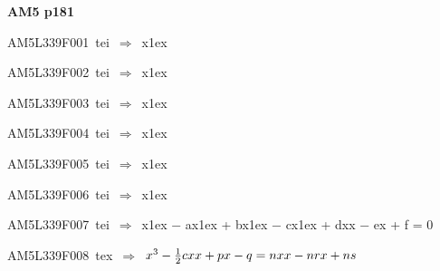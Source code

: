\par\vfill\eject
{\bf\hfill AM5 p181\hfill\hbox{}}\par\bigskip
{\sixrm AM5L339F001\ {\sixit tei}\ }$\Rightarrow$\ {\tenit x}\raise1ex\hbox{}\par\smallskip
{\sixrm AM5L339F002\ {\sixit tei}\ }$\Rightarrow$\ {\tenit x}\raise1ex\hbox{}\par\smallskip
{\sixrm AM5L339F003\ {\sixit tei}\ }$\Rightarrow$\ {\tenit x}\raise1ex\hbox{}\par\smallskip
{\sixrm AM5L339F004\ {\sixit tei}\ }$\Rightarrow$\ {\tenit x}\raise1ex\hbox{}\par\smallskip
{\sixrm AM5L339F005\ {\sixit tei}\ }$\Rightarrow$\ {\tenit x}\raise1ex\hbox{}\par\smallskip
{\sixrm AM5L339F006\ {\sixit tei}\ }$\Rightarrow$\ {\tenit x}\raise1ex\hbox{}\par\smallskip
{\sixrm AM5L339F007\ {\sixit tei}\ }$\Rightarrow$\ {\tenit x}\raise1ex\hbox{} − {\tenit ax}\raise1ex\hbox{} + {\tenit bx}\raise1ex\hbox{} − {\tenit cx}\raise1ex\hbox{} + {\tenit dxx} − {\tenit ex} + {\tenit f} = 0\par\smallskip
{\sixrm AM5L339F008\ {\sixit tex}\ }$\Rightarrow$\ $x^{3} - {{1\over 2}}cxx + px - q = nxx - nrx + ns$\par\smallskip

